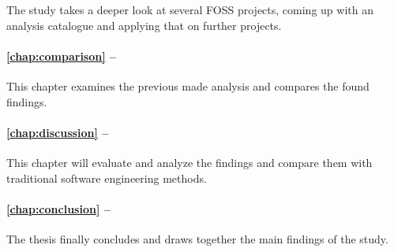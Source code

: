 The study takes a deeper look at several \ac{FOSS} projects, coming up with an
analysis catalogue and applying that on further projects.

\paragraph{\autoref{chap:comparison} -- }

This chapter examines the previous made analysis and compares the found findings.

\paragraph{\autoref{chap:discussion} -- }

This chapter will evaluate and analyze the findings and compare them with
traditional software engineering methods.

\paragraph{\autoref{chap:conclusion} -- }

The thesis finally concludes and draws together the main findings of the study.


